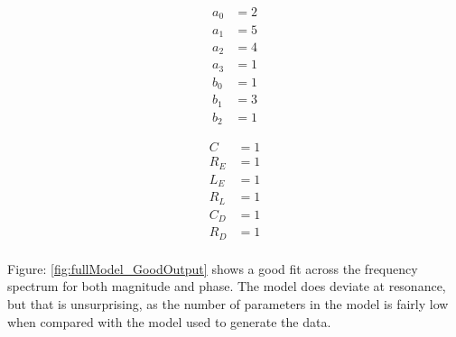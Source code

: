 \begin{multicols}{2}
    \mbox{}\vfill
    \begin{equation}
        \label{equ:fullModel_GoodInputCoeff}
        \begin{split}
             a_0 &= 2 \\
             a_1 &= 5 \\
             a_2 &= 4 \\
             a_3 &= 1 \\
             b_0 &= 1 \\
             b_1 &= 3 \\
             b_2 &= 1
        \end{split}
    \end{equation}

    \mbox{}\vfill
    \columnbreak

    \mbox{}\vfill
    \begin{equation}
        \label{equ:fullModel_GoodInputParams}
        \begin{split}
             C   &= 1 \\
             R_E &= 1 \\
             L_E &= 1 \\
             R_L &= 1 \\
             C_D &= 1 \\
             R_D &= 1 \\
        \end{split}
    \end{equation}
    \mbox{}\vfill
\end{multicols}



Figure: \ref{fig:fullModel_GoodOutput} shows a good fit across the frequency spectrum for both magnitude and phase. The model does deviate at resonance, but that is unsurprising, as the number of parameters in the model is fairly low when compared with the model used to generate the data.

